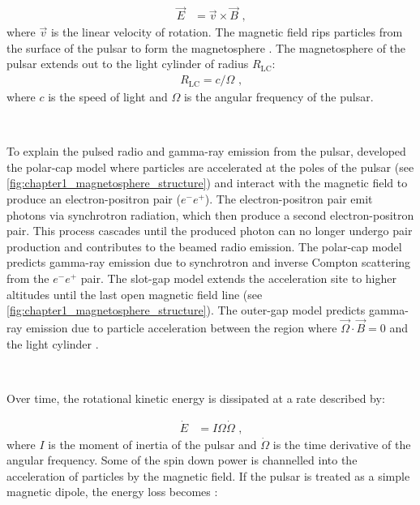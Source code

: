 \begin{equation}
    \begin{aligned}
    \vec{E} &= \vec{v} \times \vec{B}\text{ ,}
    \end{aligned}
\end{equation}
where $\vec{v}$ is the linear velocity of rotation. The magnetic field rips particles from the surface of the pulsar to form the magnetosphere \cite{1968Natur.218..731G,1969ApJ...157..869G}. The magnetosphere of the pulsar extends out to the light cylinder of radius $R_\text{LC}$:
\begin{equation}
    \begin{aligned}
    R_\text{LC}=c/\Omega\text{ ,}
    \end{aligned}
\end{equation}
where $c$ is the speed of light and $\Omega$ is the angular frequency of the pulsar.
\par~\par
To explain the pulsed radio and gamma-ray emission from the pulsar, \cite{1971ApJ...164..529S} developed the polar-cap model where particles are accelerated at the poles of the pulsar (see \autoref{fig:chapter1_magnetosphere_structure}) and interact with the magnetic field to produce an electron-positron pair ($e^-e^+$). The electron-positron pair emit photons via synchrotron radiation, which then produce a second electron-positron pair. This process cascades until the produced photon can no longer undergo pair production and contributes to the beamed radio emission. The polar-cap model predicts gamma-ray emission due to synchrotron and inverse Compton scattering from the $e^-e^+$ pair. The slot-gap model \citep{1983ApJ...266..215A} extends the acceleration site to higher altitudes until the last open magnetic field line (see \autoref{fig:chapter1_magnetosphere_structure}). The outer-gap model predicts gamma-ray emission due to particle acceleration between the region where $\vec{\Omega}\cdot\vec{B}=0$ and the light cylinder \citep{1986ApJ...300..500C}.
\par~\par
Over time, the rotational kinetic energy is dissipated at a rate described by:

\begin{equation}
    \begin{aligned}
        \dot{E}&=I\Omega\dot{\Omega}\text{ ,}
    \end{aligned}
\end{equation}
\noindent where $I$ is the moment of inertia of the pulsar and $\dot{\Omega}$ is the time derivative of the angular frequency. Some of the spin down power is channelled into the acceleration of particles by the magnetic field. If the pulsar is treated as a simple magnetic dipole, the energy loss becomes \citep{Slane2017}: 

